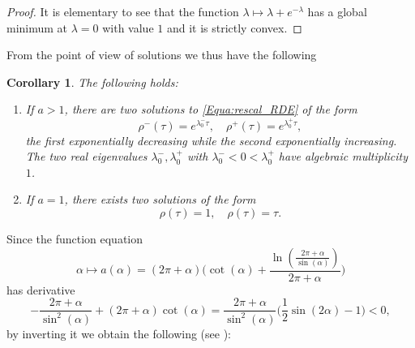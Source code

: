 \documentclass[reqno]{amsart}
\theoremstyle{definition} \newtheorem{definition}{Definition}[section]
\theoremstyle{definition} \newtheorem{remark}[definition]{Remark}
\theoremstyle{plain} \newtheorem{lemma}[definition]{Lemma}
\theoremstyle{plain} \newtheorem{proposition}[definition]{Proposition}
\theoremstyle{plain} \newtheorem{theorem}[definition]{Theorem}
\theoremstyle{plain} \newtheorem{corollary}[definition]{Corollary}
\theoremstyle{definition} \newtheorem{example}[definition]{Example}
\theoremstyle{plain} \newtheorem{claim}[clai]{Claim}
\theoremstyle{definition} \newtheorem{assumption}[definition]{Assumption}
\theoremstyle{definition} \newtheorem{observation}[definition]{Observation}
\newcommand{\1}{\mathbbm 1}
\numberwithin{equation}{section} %
\theoremstyle{plain} \newtheorem*{theorem*}{Theorem}
\theoremstyle{plain} \newtheorem{mthm}[maintheorem]{Main Theorem}
\theoremstyle{plain} \newtheorem*{mthm*}{Main Theorem}
\theoremstyle{plain} \newtheorem*{conjecture*}{Conjecture}
\theoremstyle{plain} \newtheorem{conjecture}[definition]{Conjecture}
\theoremstyle{plain} \newtheorem*{problem*}{Problem}
\begin{document}
\begin{proof}
It is elementary to see that the function $\lambda \mapsto \lambda + e^{-\lambda}$ has a global minimum at $\lambda = 0$ with value $1$ and it is strictly convex.
\end{proof}

From the point of view of solutions we thus have \cite[Theorem 4.1]{RDE} the following

\begin{corollary}
\label{Cor:rho_fund_sol_exp}
The following holds:
\begin{enumerate}
\item If $a > 1$, there are two solutions to \eqref{Equa:rescal_RDE} of the form
\begin{equation*}
\rho^-(\tau) = e^{\lambda_0^- \tau}, \quad \rho^+(\tau) = e^{\lambda_0^+ \tau},
\end{equation*}
the first exponentially decreasing while the second exponentially increasing. The two 
real eigenvalues $\lambda_0^-,\lambda_0^+$ with $\lambda_0^- < 0 < \lambda_0^+$ have algebraic multiplicity $1$.
\item If $a = 1$, there exists two solutions of the form
\begin{equation*}
\rho(\tau) = 1, \quad \rho(\tau) = \tau.
\end{equation*} %
\end{enumerate}
\end{corollary}

Since the function equation
\begin{equation*}
\alpha \mapsto a(\alpha) = (2\pi +\alpha) \bigg( \cot(\alpha) + \frac{\ln(\frac{2\pi + \alpha}{\sin(\alpha)})}{2\pi + \alpha} \bigg)
\end{equation*}
has derivative
\begin{equation*}
- \frac{2\pi + \alpha}{\sin^2(\alpha)} + (2\pi + \alpha) \cot(\alpha) = \frac{2\pi + \alpha}{\sin^2(\alpha)} \bigg( \frac{1}{2} \sin(2\alpha) - 1 \bigg) < 0,
\end{equation*}
by inverting it we obtain the following (see \cite[Lemma 6]{firefighter}):
\end{document}
